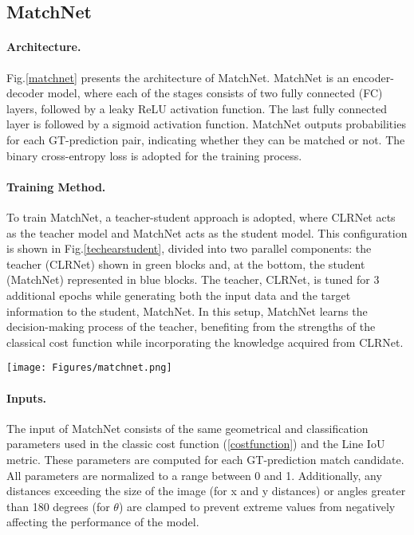 \documentclass[10pt,twocolumn,letterpaper]{article}
\begin{document}
\subsection{\textbf{MatchNet}}
\paragraph{\textbf{Architecture.}}Fig.\ref{matchnet} presents the architecture of MatchNet. MatchNet is an encoder-decoder model, where each of the stages consists of two fully connected (FC) layers, followed by a leaky ReLU activation function. The last fully connected layer is followed by a sigmoid activation function. MatchNet outputs probabilities for each GT-prediction pair, indicating whether they can be matched or not. The binary cross-entropy loss is adopted for the training process. 

\paragraph{\textbf{Training Method.}}To train MatchNet, a teacher-student approach is adopted, where CLRNet acts as the teacher model and MatchNet acts as the student model. This configuration is shown in Fig.\ref{techearstudent},  divided into two parallel components: the teacher (CLRNet) shown in green blocks and, at the bottom, the student (MatchNet) represented in blue blocks. The teacher, CLRNet, is tuned for 3 additional epochs while generating both the input data and the target information to the student, MatchNet. In this setup, MatchNet learns the decision-making process of the teacher, benefiting from the strengths of the classical cost function while incorporating the knowledge acquired from CLRNet. 

\begin{figure*}[t]
\begin{center}
    \texttt{[image: Figures/matchnet.png]}
\caption{Architecture of MatchNet: A fully connected model for match classification. As an input, MatchNet receives geometrical parameters of $N$ predictions in relative to each one of the GT, and outputs probabilities defining whether the each pair is positive or negative."}
\label{matchnet}
\end{center}
\end{figure*}

\paragraph{\textbf{Inputs.}}The input of MatchNet consists of the same geometrical and classification parameters used in the classic cost function (\ref{costfunction}) and the Line IoU metric. These parameters are computed for each GT-prediction match candidate. All parameters are normalized to a range between 0 and 1. Additionally, any distances exceeding the size of the image (for x and y distances) or angles greater than 180 degrees (for $\theta$) are clamped to prevent extreme values from negatively affecting the performance of the model.
\end{document}
